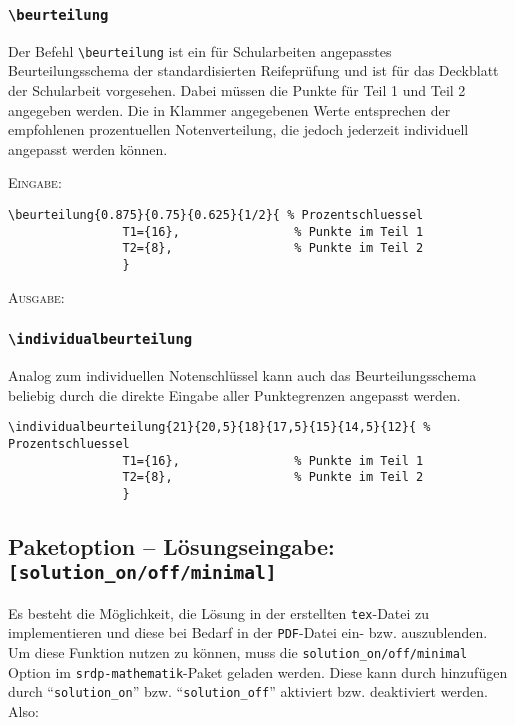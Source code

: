 \documentclass[a4paper,12pt]{article}
\begin{document}
\subsubsection{\texttt{\textbackslash beurteilung}}

Der Befehl \texttt{\textbackslash beurteilung} ist ein für Schularbeiten angepasstes Beurteilungsschema der standardisierten Reifeprüfung und ist für das Deckblatt der Schularbeit vorgesehen. Dabei müssen die Punkte für Teil 1 und Teil 2 angegeben werden. Die in Klammer angegebenen Werte entsprechen der empfohlenen prozentuellen Notenverteilung, die jedoch jederzeit individuell angepasst werden können. \leer  


\textsc{Eingabe:}
\begin{verbatim}
\beurteilung{0.875}{0.75}{0.625}{1/2}{ % Prozentschluessel
				T1={16}, 				% Punkte im Teil 1  
				T2={8}, 				% Punkte im Teil 2
				}

\end{verbatim}
\textsc{Ausgabe:}\leer



\subsubsection{\texttt{\textbackslash individualbeurteilung}}
Analog zum individuellen Notenschlüssel kann auch das Beurteilungsschema beliebig durch die direkte Eingabe aller Punktegrenzen angepasst werden.

\begin{verbatim}
\individualbeurteilung{21}{20,5}{18}{17,5}{15}{14,5}{12}{ % Prozentschluessel
				T1={16}, 				% Punkte im Teil 1  
				T2={8}, 				% Punkte im Teil 2
				}
\end{verbatim}

\newpage

\subsection{Paketoption -- Lösungseingabe: \texttt{[solution\_on/off/minimal]}}

Es besteht die Möglichkeit, die Lösung in der erstellten \texttt{tex}-Datei zu implementieren und diese bei Bedarf in der \texttt{PDF}-Datei ein- bzw. auszublenden. Um diese Funktion nutzen zu können, muss die \texttt{solution\_on/off/minimal} Option im \texttt{srdp-mathematik}-Paket geladen werden. Diese kann durch hinzufügen durch "`\texttt{solution\_on}"' bzw. "`\texttt{solution\_off}"' aktiviert bzw. deaktiviert werden. Also:
\end{document}
